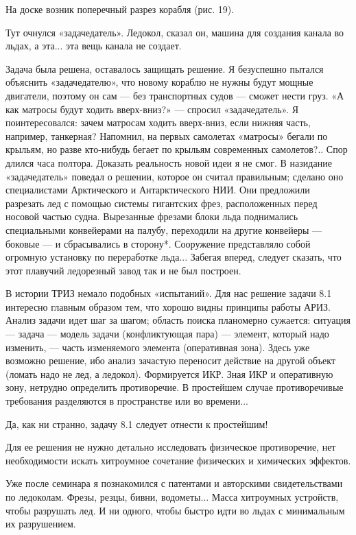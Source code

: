 На доске возник поперечный разрез корабля (рис. 19).

Тут очнулся  «задачедатель». Ледокол,  сказал он, машина  для создания
канала во льдах, а эта... эта вещь канала не создает.

Задача была решена, оставалось  защищать решение. Я безуспешно пытался
объяснить  «задачедателю», что  новому кораблю  не нужны  будут мощные
двигатели,  поэтому  он   сам  —  без  транспортных   судов  —  сможет
нести  груз.  «А  как  матросы будут  ходить  вверх-вниз?»  —  спросил
«задачедатель». Я  поинтересовался: зачем матросам  ходить вверх-вниз,
если нижняя часть, например,  танкерная? Напомнил, на первых самолетах
«матросы» бегали  по крыльям,  но разве  кто-нибудь бегает  по крыльям
современных самолетов?.. Спор длился часа полтора. Доказать реальность
новой идеи  я не смог.  В назидание «задачедатель» поведал  о решении,
которое он считал правильным; сделано оно специалистами Арктического и
Антарктического НИИ.  Они предложили  разрезать лед с  помощью системы
гигантских фрез, расположенных перед  носовой частью судна. Вырезанные
фрезами  блоки льда  поднимались специальными  конвейерами на  палубу,
переходили на другие конвейеры —  боковые — и сбрасывались в сторону*.
Сооружение  представляло  собой   огромную  установку  по  переработке
льда... Забегая вперед, следует  сказать, что этот плавучий ледорезный
завод так и не был построен.


В истории ТРИЗ немало подобных «испытаний». Для нас решение задачи 8.1
интересно главным образом тем, что  хорошо видны принципы работы АРИЗ.
Анализ задачи идет  шаг за шагом; область  поиска планомерно сужается:
ситуация  — задача  — модель  задачи (конфликтующая  пара) —  элемент,
который  надо  изменить,  — часть  изменяемого  элемента  (оперативная
зона).  Здесь  уже возможно  решение,  ибо  анализ зачастую  переносит
действие на другой объект (ломать надо не лед, а ледокол). Формируется
ИКР. Зная ИКР и оперативную  зону, нетрудно определить противоречие. В
простейшем случае противоречивые требования разделяются в пространстве
или во времени...

Да, как ни странно, задачу 8.1 следует отнести к простейшим!

Для ее решения не  нужно детально исследовать физическое противоречие,
нет необходимости искать хитроумное  сочетание физических и химических
эффектов.

Уже   после  семинара   я  познакомился   с  патентами   и  авторскими
свидетельствами по  ледоколам. Фрезы, резцы, бивни,  водометы... Масса
хитроумных устройств, чтобы  разрушать лед. И ни  одного, чтобы быстро
идти во льдах с минимальным их разрушением.

